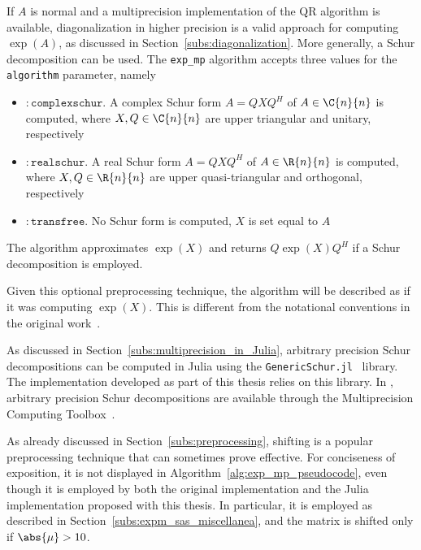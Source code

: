 If $A$ is normal and a multiprecision implementation of the QR algorithm is available, diagonalization in higher precision is a valid approach for computing $\exp(A)$, as discussed in Section~\ref{subs:diagonalization}. More generally, a Schur decomposition can be used. The \texttt{exp\_mp} algorithm accepts three values for the \texttt{algorithm} parameter, namely
\begin{itemize}
	\item $\mathtt{\colon\!complexschur}$. A complex Schur form $A=QXQ^{H}$ of $A\in\C{n}{n}$ is computed, where $X,Q\in\C{n}{n}$ are upper triangular and unitary, respectively
	\item $\mathtt{\colon\!realschur}$. A real Schur form $A=QXQ^{H}$ of $A\in\R{n}{n}$ is computed, where $X,Q\in\R{n}{n}$ are upper quasi-triangular and orthogonal, respectively
	\item $\mathtt{\colon\!transfree}$. No Schur form is computed, $X$ is set equal to $A$
\end{itemize}
The algorithm approximates $\exp(X)$ and returns $Q\exp(X)Q^{H}$ if a Schur decomposition is employed. 
\begin{notazione*}
	Given this optional preprocessing technique, the algorithm will be described as if it was computing $\exp(X)$. This is different from the notational conventions in the original work~\cite{higham:hf19_mpexpm}. 
\end{notazione*}
As discussed in Section~\ref{subs:multiprecision_in_Julia}, arbitrary precision Schur decompositions can be computed in Julia using the \texttt{GenericSchur.jl}~\cite{sw:GenericSchur} library. The implementation developed as part of this thesis relies on this library. In \matlab{}, arbitrary precision Schur decompositions are available through the Multiprecision Computing Toolbox~\cite{matlab_mpct}.

\begin{oss}
	As already discussed in Section~\ref{subs:preprocessing}, shifting is a popular preprocessing technique that can sometimes prove effective. For conciseness of exposition, it is not displayed in Algorithm~\ref{alg:exp_mp_pseudocode}, even though it is employed by both the original \matlab{} implementation and the Julia implementation proposed with this thesis. In particular, it is employed as described in Section~\ref{subs:expm_sas_miscellanea}, and the matrix is shifted only if $\abs{\mu}>10$.
\end{oss}
\smallskip 

